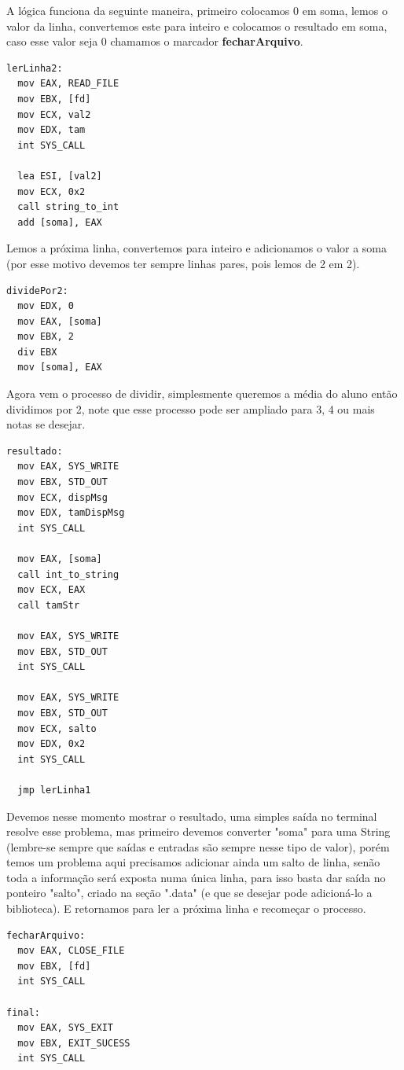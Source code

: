 A lógica funciona da seguinte maneira, primeiro colocamos 0 em soma, lemos o valor da linha, convertemos este para inteiro e colocamos o resultado em soma, caso esse valor seja 0 chamamos o marcador \textbf{fecharArquivo}.
\begin{lstlisting}[]
lerLinha2:
  mov EAX, READ_FILE
  mov EBX, [fd]
  mov ECX, val2
  mov EDX, tam   
  int SYS_CALL

  lea ESI, [val2]
  mov ECX, 0x2
  call string_to_int
  add [soma], EAX
\end{lstlisting}

Lemos a próxima linha, convertemos para inteiro e adicionamos o valor a soma (por esse motivo devemos ter sempre linhas pares, pois lemos de 2 em 2).
\begin{lstlisting}[]
dividePor2:
  mov EDX, 0
  mov EAX, [soma]
  mov EBX, 2
  div EBX
  mov [soma], EAX
\end{lstlisting}

Agora vem o processo de dividir, simplesmente queremos a média do aluno então dividimos por 2, note que esse processo pode ser ampliado para 3, 4 ou mais notas se desejar.
\begin{lstlisting}[]
resultado:
  mov EAX, SYS_WRITE
  mov EBX, STD_OUT
  mov ECX, dispMsg
  mov EDX, tamDispMsg
  int SYS_CALL

  mov EAX, [soma]
  call int_to_string
  mov ECX, EAX
  call tamStr

  mov EAX, SYS_WRITE
  mov EBX, STD_OUT
  int SYS_CALL
    
  mov EAX, SYS_WRITE
  mov EBX, STD_OUT
  mov ECX, salto
  mov EDX, 0x2
  int SYS_CALL

  jmp lerLinha1
\end{lstlisting}

Devemos nesse momento mostrar o resultado, uma simples saída no terminal resolve esse problema, mas primeiro devemos converter "soma" para uma String (lembre-se sempre que saídas e entradas são sempre nesse tipo de valor), porém temos um problema aqui precisamos adicionar ainda um salto de linha, senão toda a informação será exposta numa única linha, para isso basta dar saída no ponteiro "salto", criado na seção ".data" (e que se desejar pode adicioná-lo a biblioteca). E retornamos para ler a próxima linha e recomeçar o processo.

\begin{lstlisting}[]
fecharArquivo:
  mov EAX, CLOSE_FILE
  mov EBX, [fd]
  int SYS_CALL

final:
  mov EAX, SYS_EXIT
  mov EBX, EXIT_SUCESS
  int SYS_CALL
\end{lstlisting}

